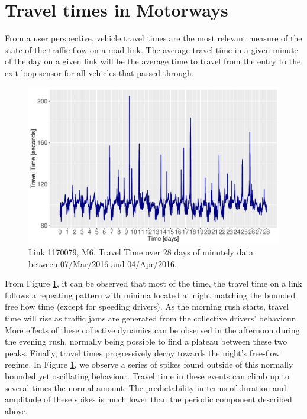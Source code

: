 \documentclass[a4paper, 10pt, conference]{ieeeconf}      %
\begin{document}
\section{Travel times in Motorways} \label{Travel times in Motorways}
From a user perspective, vehicle travel times are the most relevant measure of the state of the traffic flow on a road link.
The average travel time in a given minute of the day on a given link will be the average time to travel from the entry to the exit loop sensor for all vehicles that passed through.
\begin{figure}[htbp]
\centerline{\includegraphics[width=\linewidth]{./images/Travel_Time.pdf}}
\caption{Link 1170079, M6. Travel Time over 28 days of minutely data between 07/Mar/2016 and 04/Apr/2016.}
\label{fig:travel_time}
\end{figure}
From Figure \ref{fig:travel_time}, it can be observed that most of the time, the travel time on a link follows a repeating pattern with minima located at night matching the bounded free flow time (except for speeding drivers).
As the morning rush starts, travel time will rise as traffic jams are generated from the collective drivers' behaviour.
More effects of these collective dynamics can be observed in the afternoon during the evening rush, normally being possible to find a plateau between these two peaks.
Finally, travel times progressively decay towards the night's free-flow regime.
In Figure \ref{fig:travel_time}, we observe a series of spikes found outside of this normally bounded yet oscillating behaviour. 
Travel time in these events can climb up to several times the normal amount.
The predictability in terms of duration and amplitude of these spikes is much lower than the periodic component described above.
\end{document}
